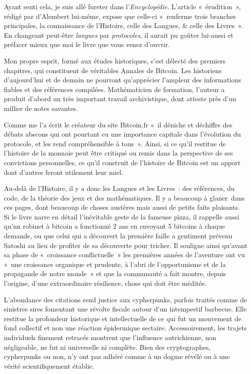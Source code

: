 Ayant senti cela, je suis allé fureter dans l'\emph{Encyclopédie}. L'article «~érudition~», rédigé par d'Alembert lui-même, expose que celle-ci «~renferme trois branches principales, la connaissance de l'Histoire, celle des Langues, \& celle des Livres~». En changeant peut-être \emph{langues} par \emph{protocoles}, il aurait pu goûter lui-aussi et préfacer mieux que moi le livre que vous venez d'ouvrir.

Mon propre esprit, formé aux études historiques, s'est délecté des premiers chapitres, qui constituent de véritables Annales de Bitcoin. Les historiens d'aujourd'hui et de demain ne pourront qu'apprécier l'ampleur des informations fiables et des références compilées. Mathématicien de formation, l'auteur a produit d'abord un très important travail archivistique, dont atteste près d'un millier de notes savantes.

Comme me l'a écrit le créateur du site Bitcoin.fr «~il déniche et déchiffre des débats abscons qui ont pourtant eu une importance capitale dans l'évolution du protocole, et les rend compréhensible à tous~». Ainsi, si ce qu'il restitue de l'histoire de la monnaie peut être critiqué ou remis dans la perspective de ses convictions personnelles, ce qu'il construit de l'histoire de Bitcoin est un apport dont d'autres feront utilement leur miel.

Au-delà de l'Histoire, il y a donc les Langues et les Livres~: des références, du code, de la théorie des jeux et des mathématiques. Il y a beaucoup à glaner~dans ces pages, dont beaucoup de choses austères mais aussi de petits faits plaisants. Si le livre narre en détail l'inévitable geste de la fameuse pizza, il rappelle aussi qu'un robinet à bitcoin a fonctionné 2 ans en envoyant 5 bitcoins à chaque demande, ou que celui qui a découvert la première faille a gentiment prévenu Satoshi au lieu de profiter de sa découverte pour tricher. Il souligne ainsi qu'avant sa phase de «~croissance conflictuelle~» les premières années de l'aventure ont vu «~une croissance organique et prudente, à l'abri de l'opportunisme et de la propagande de notre monde~» et que la communauté a fait montre, depuis l'origine, d'une extraordinaire résilience, chose qui doit être méditée.

L'abondance des citations rend justice aux cypherpunks, parfois traités comme de sinistres sires fomentant une révolte fiscale autour d'un intempestif barbecue. Elle restitue la profondeur historique et intellectuelle de ce qui fut un mouvement de fond collectif et non une réaction épidermique sectaire. Accessoirement, les trajets individuels finement retracés montrent que l'influence autrichienne, non négligeable, ne fut ni universelle ni complète. Bien des cryptographes, cypherpunks ou non, n'y ont pas adhéré comme à un dogme révélé ou à une vérité scientifiquement établie.

